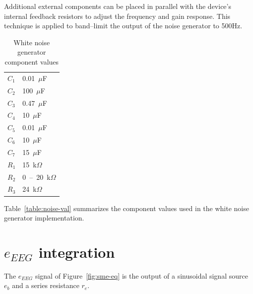 Additional external components can be placed in parallel with the
device's internal feedback resistors to adjust the frequency and gain
response. This technique is applied to band--limit the output of the
noise generator to 500Hz. 

\begin{table}
\begin{center}	
	\begin{tabular}[htpb]{|l|l|} \hline
	$C_1$ & 0.01~$\mu$F \\
	$C_2$ & 100~$\mu$F \\
	$C_3$ & 0.47~$\mu$F \\
	$C_4$ & 10~$\mu$F \\
	$C_5$ & 0.01~$\mu$F \\
	$C_6$ & 10~$\mu$F \\
	$C_7$ & 15~$\mu$F \\
	$R_1$ & 15~k$\Omega$ \\
	$R_2$ & 0~--~20~k$\Omega$ \\
	$R_3$ & 24~k$\Omega$ \\
	\hline
	\end{tabular}
	\caption{White noise generator component values}
	\label{table:noise-val}
\end{center}	
\end{table}

Table~\vref{table:noise-val} summarizes the component values used in
the white noise generator implementation.


\section{$e_{EEG}$ integration}

The $e_{EEG}$ signal of Figure~\vref{fig:sme-eq} is the output of a
sinusoidal signal source $e_{b}$ and a series resistance $r_e$.

